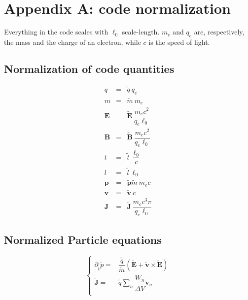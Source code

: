 \documentclass[11pt,a4paper]{report}
\begin{document}
 

\chapter*{Appendix A: code normalization}
Everything in the code scales with $\ell_0$ scale-length.
$m_e$ and $q_e$ are, respectively, the mass and the charge of an electron, while $c$ is the speed of light.

\section*{Normalization of code quantities}
\begin{eqnarray*}
q          &=& \widetilde{q}                        \: q_e                              \\
m          &=& \widetilde{m}                        \: m_e                              \\
\mathbf{E} &=& \widetilde{\mathbf{E}}               \: \dfrac{m_e c^2}{q_e \ell_0}      \\
\mathbf{B} &=& \widetilde{\mathbf{B}}               \: \dfrac{m_e c^2}{q_e \ell_0}      \\
t          &=& \widetilde{t}                        \: \dfrac{\ell_0}{c}                \\
l          &=& \widetilde{l}                        \: \ell_0                           \\
\mathbf{p} &=& \widetilde{\mathbf{p}} \widetilde{m} \: m_e c                            \\
\mathbf{v} &=& \widetilde{\mathbf{v}}               \: c                                \\
\mathbf{J} &=& \widetilde{\mathbf{J}}               \: \dfrac{m_e c^3 \pi}{q_e \ell_0}
\end{eqnarray*}

\section*{Normalized Particle equations}
$$
\begin{cases}
    \partial_{\widetilde{t}} \widetilde{p} = & \dfrac{\widetilde{q}}{\widetilde{m}} \left({\widetilde{\mathbf{E}} + \widetilde{\mathbf{v}} \times \widetilde{\mathbf{E}}}\right) \\
   \widetilde{\mathbf{J}} = & \widetilde{q} \sum_n{\dfrac{W_n}{\Delta \widetilde{V}} \widetilde{\mathbf{v}}_n} \\
\end{cases}
$$
\end{document}
